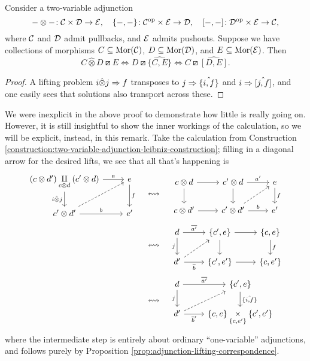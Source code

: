 \begin{proposition}\label{prop:two-variable-adjunction-lifting-correspondence}
	Consider a two-variable adjunction
	\[ -\otimes-\!: \mathcal{C}\times\mathcal{D}\to\mathcal{E},\quad \{-,-\}\!:\mathcal{C}^{\mathrm{op}}\times\mathcal{E}\to\mathcal{D},\quad [-,-]\!:\mathcal{D}^{\mathrm{op}}\times\mathcal{E}\to\mathcal{C}, \]
	where \(\mathcal{C}\) and \(\mathcal{D}\) admit pullbacks, and \(\mathcal{E}\) admits pushouts. Suppose we have collections of morphisms \(C\subseteq\operatorname{Mor}(\mathcal{C})\), \(D\subseteq\operatorname{Mor}(\mathcal{D})\), and
	\(E\subseteq\operatorname{Mor}(\mathcal{E})\). Then
	\[ C\hat\otimes D \boxslash E \iff D\boxslash \hat{\{C,E\}} \iff C \boxslash \hat{[D,E]}. \]
\end{proposition}
\begin{proof}
A lifting problem \(i\hat\otimes j \Rightarrow f\) transposes to \(j \Rightarrow \hat{\{i,f\}}\) and \(i \Rightarrow \hat{ [j,f] }\), and one easily sees that solutions also
transport across these.
\end{proof}
\begin{remark}
	We were inexplicit in the above proof to demonstrate how little is really going on. However, it is still insightful to show the inner workings of the calculation,
	so we will be explicit, instead, in this remark. Take the calculation from Construction \ref{construction:two-variable-adjunction-leibniz-construction};
	filling in a diagonal arrow for the desired lifts, we see that all that's happening is
	\begin{align*}
		\begin{tikzcd}[ampersand replacement=\&]
			(c\otimes d') \underset{c\otimes d}\amalg(c'\otimes d) \ar[d,"i\hat\otimes j"']\ar[r,"a"] \& e\ar[d,"f"] \\
			c'\otimes d'\ar[r,"b"]\ar[ur,dashed] \& e'
		\end{tikzcd} \quad &\leftrightsquigarrow \quad
		\begin{tikzcd}[ampersand replacement=\&]
			c\otimes d\ar[r]\ar[d] \& c'\otimes d \ar[d]\ar[r,"a'"] \& e\ar[d,"f"] \\
			c\otimes d'\ar[r] \& c'\otimes d'\ar[r,"b"] \ar[ur,dashed] \& e'
		\end{tikzcd} \\
		&\leftrightsquigarrow \quad
		\begin{tikzcd}[ampersand replacement=\&]
			d\ar[r,"\overline{a'}"]\ar[d,"j"'] \& \{c',e\} \ar[d]\ar[r] \& \{c,e\} \ar[d,"f"] \\
			d'\ar[r,"\overline{b}"']\ar[ur,dashed] \& \{c',e'\}\ar[r] \& \{c,e'\}
		\end{tikzcd} \\
		&\leftrightsquigarrow \quad
		\begin{tikzcd}[ampersand replacement=\&]
			d\ar[r,"\overline{a'}"]\ar[d,"j"'] \& \{c',e\} \ar[d,"\hat{ \{i,f\} }"] \\
			d'\ar[r,"\overline{b}'"']\ar[ur,dashed] \& \{c,e\}\underset{\{c,e'\}}\times \{c',e'\}
		\end{tikzcd}
	\end{align*}
	where the intermediate step is entirely about ordinary ``one-variable'' adjunctions, and follows purely by Proposition \ref{prop:adjunction-lifting-correspondence}.
\end{remark}

